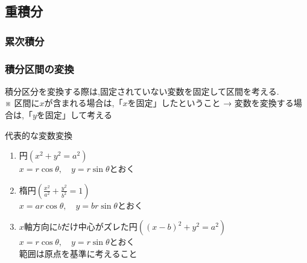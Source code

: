 \documentclass[a4paper]{jsarticle}
\begin{document}
\subsection{重積分}
\subsubsection{累次積分}
\subsubsection{積分区間の変換}
積分区分を変換する際は,固定されていない変数を固定して区間を考える.\\
※ 区間に$x$が含まれる場合は,「$x$を固定」したということ → 変数を変換する場合は,「$y$を固定」して考える
\begin{itembox}[l]{代表的な変数変換}
    \begin{enumerate}[(1)]
        \item 円\quad $\left(x^2+y^2=a^2\right)$\\
              $x=r\cos\theta,\quad y=r\sin\theta$とおく
        \item 楕円\quad $\left(\frac{x^2}{a^2}+\frac{y^2}{b^2}=1\right)$\\
              $x=ar\cos\theta,\quad y=br\sin\theta$とおく
        \item $x$軸方向に$b$だけ中心がズレた円\quad $\left(\left(x-b\right)^2+y^2=a^2\right)$\\
              $x=r\cos\theta,\quad y=r\sin\theta$とおく\\
              範囲は原点を基準に考えること
    \end{enumerate}
\end{itembox}
\end{document}
